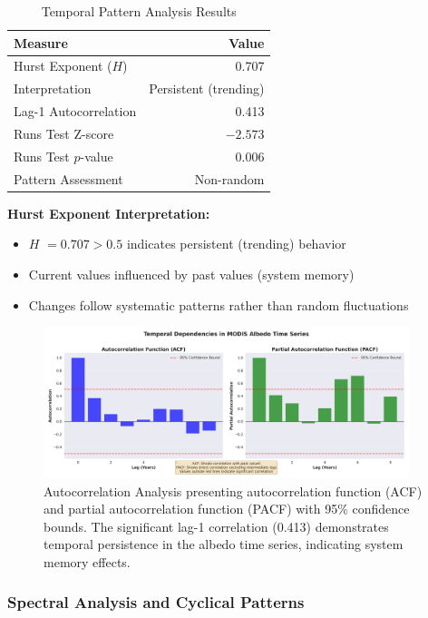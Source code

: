\documentclass[12pt,a4paper]{article}
\newcommand{\pvalue}{$p$-value}
\newcommand{\hurst}{$H$}
\begin{document}
\begin{table}[H]
\centering
\caption{Temporal Pattern Analysis Results}
\label{tab:temporal_patterns}
\begin{tabular}{@{}lr@{}}
\toprule
\textbf{Measure} & \textbf{Value} \\
\midrule
Hurst Exponent (\hurst) & 0.707 \\
Interpretation & Persistent (trending) \\
Lag-1 Autocorrelation & 0.413 \\
Runs Test Z-score & $-2.573$ \\
Runs Test \pvalue & 0.006 \\
Pattern Assessment & Non-random \\
\bottomrule
\end{tabular}
\end{table}

\textbf{Hurst Exponent Interpretation:}
\begin{itemize}
    \item \hurst{} $= 0.707 > 0.5$ indicates persistent (trending) behavior
    \item Current values influenced by past values (system memory)
    \item Changes follow systematic patterns rather than random fluctuations
\end{itemize}

\begin{figure}[H]
\centering
\includegraphics[width=0.95\textwidth]{advanced_plots/autocorrelation_analysis.png}
\caption{Autocorrelation Analysis presenting autocorrelation function (ACF) and partial autocorrelation function (PACF) with 95\% confidence bounds. The significant lag-1 correlation (0.413) demonstrates temporal persistence in the albedo time series, indicating system memory effects.}
\label{fig:autocorrelation}
\end{figure}

\subsubsection{Spectral Analysis and Cyclical Patterns}
\end{document}

